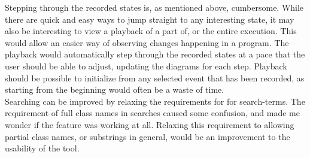 Stepping through the recorded states is, as mentioned above, cumbersome.
While there are quick and easy ways to jump straight to any interesting state, it may also be interesting to view a playback of a part of, or the entire execution.
This would allow an easier way of observing changes happening in a program.
The playback would automatically step through the recorded states at a pace that the user should be able to adjust, updating the diagrams for each step.
Playback should be possible to initialize from any selected event that has been recorded, as starting from the beginning would often be a waste of time.
~\\

Searching can be improved by relaxing the requirements for for search-terms.
The requirement of full class names in searches caused some confusion, and made me wonder if the feature was working at all.
Relaxing this requirement to allowing partial class names, or substrings in general, would be an improvement to the usability of the tool.
~\\
